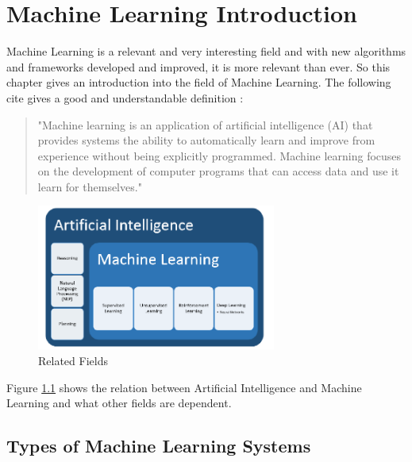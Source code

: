 \documentclass[notitlepage,english]{hgbreport}
\begin{document}
\chapter{Machine Learning Introduction}
\label{chap:Introduction}

Machine Learning is a relevant and very interesting field and with new algorithms and frameworks developed and improved, it is more relevant than ever. So this chapter gives an introduction into the field of Machine Learning. The following cite gives a good and understandable definition \cite{expertSystem}:
\begin{quote}
"Machine learning is an application of artificial intelligence (AI) that provides systems the ability to automatically learn and improve from experience without being explicitly programmed. Machine learning focuses on the development of computer programs that can access data and use it learn for themselves."
\end{quote}

\begin{figure}[ht]
	\centering
	\includegraphics[width=0.7\textwidth]{images/AI_Overwiew}
	\caption{Related Fields \cite{mueller2016machine}}
\label{fig:relatedFields}
\end{figure}
\noindent Figure \ref{fig:relatedFields} shows the relation between Artificial Intelligence and Machine Learning and what other fields are dependent.

\newpage


\section{Types of Machine Learning Systems}
\label{sec:typesLearningSystems}
\end{document}
